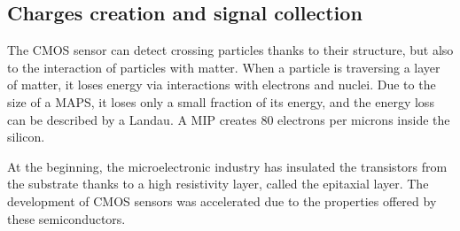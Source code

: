   


    \subsection{Charges creation and signal collection}   

    The \gls{CMOS} sensor can detect crossing particles thanks to their structure, but also to the interaction of particles with matter.
    When a particle is traversing a layer of matter, it loses energy via interactions with electrons and nuclei.
    Due to the size of a \gls{MAPS}, it loses only a small fraction of its energy, and the energy loss can be described by a Landau.
    A \gls{MIP} creates 80 electrons per microns inside the silicon.

    At the beginning, the microelectronic industry has insulated the transistors from the substrate thanks to a high resistivity layer, called the epitaxial layer.
    The development of \gls{CMOS} sensors was accelerated due to the properties offered by these semiconductors.
    
    
